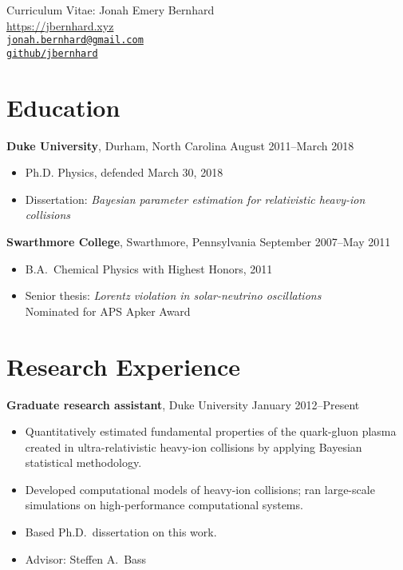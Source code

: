 \documentclass[letterpaper,10pt]{article}
\newcommand{\entry}[3]{\vspace{.5em plus .1em minus .1em}\textbf{#1}, #2 \hfill #3}
\begin{document}
\begin{center}
  \Large
  Curriculum Vitae:  Jonah Emery Bernhard \\[1ex]
  \normalsize\rm
  \url{https://jbernhard.xyz} \\
  \href{mailto:jonah.bernhard@gmail.com}{\nolinkurl{jonah.bernhard@gmail.com}} \\
  \href{https://github.com/jbernhard}{\nolinkurl{github/jbernhard}}
\end{center}


\section{Education}

\entry{Duke University}{Durham, North Carolina}{August 2011--March 2018}

\begin{itemize}
  \item Ph.D. Physics, defended March 30, 2018
  \item Dissertation: \emph{Bayesian parameter estimation for relativistic heavy-ion collisions}
\end{itemize}

\entry{Swarthmore College}{Swarthmore, Pennsylvania}{September 2007--May 2011}

\begin{itemize}
  \item B.A.\ Chemical Physics with Highest Honors, 2011
  \item Senior thesis: \emph{Lorentz violation in solar-neutrino oscillations} \\
    Nominated for APS Apker Award
\end{itemize}


\section{Research Experience}

\entry{Graduate research assistant}{Duke University}{January 2012--Present}

\begin{itemize}
  \item Quantitatively estimated fundamental properties of the quark-gluon plasma created in ultra-relativistic heavy-ion collisions by applying Bayesian statistical methodology.
  \item Developed computational models of heavy-ion collisions;
    ran large-scale simulations on high-performance computational systems.
  \item Based Ph.D.\ dissertation on this work.
  \item Advisor: Steffen A.\ Bass
\end{itemize}
\end{document}
